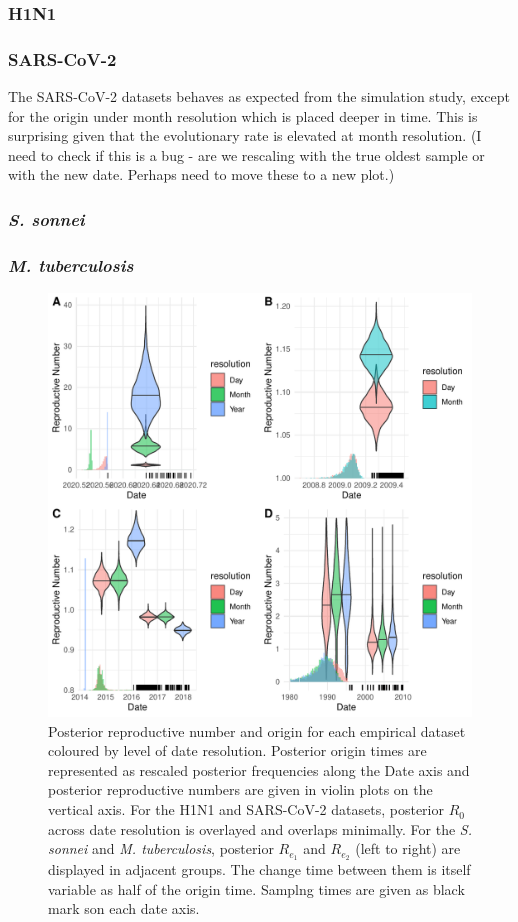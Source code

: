 \documentclass{article}
\begin{document}
\begin{spacing}{1.5}
\subsubsection*{H1N1}
\subsubsection*{SARS-CoV-2}
The SARS-CoV-2 datasets behaves as expected from the simulation study, except for the origin under month resolution which is placed deeper in time. This is surprising given that the evolutionary rate is elevated at month resolution. (I need to check if this is a bug - are we rescaling with the true oldest sample or with the new date. Perhaps need to move these to a new plot.)
\subsubsection*{\textit{S. sonnei}}
\subsubsection*{\textit{M. tuberculosis}}

\begin{figure}[h!]
    \centering
    \includegraphics{empirical_plot.pdf}
    \caption{Posterior reproductive number and origin for each empirical dataset coloured by level of date resolution. Posterior origin times are represented as rescaled posterior frequencies along the Date axis and posterior reproductive numbers are given in violin plots on the vertical axis. For the H1N1 and SARS-CoV-2 datasets, posterior $R_0$ across date resolution is overlayed and overlaps minimally. For the \textit{S. sonnei} and \textit{M. tuberculosis}, posterior $R_{e_1}$ and $R_{e_2}$ (left to right) are displayed in adjacent groups. The change time between them is itself variable as half of the origin time. Samplng times are given as black mark son each date axis.}
    \label{fig:empR}
\end{figure}


\end{spacing}
\end{document}
